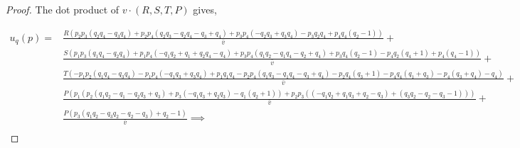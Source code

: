 \begin{proof}
The dot product of \(v \cdot (R, S, T, P)\) gives,

\begingroup
\tiny
\begin{equation*}
\begin{split}
    u_q(p) = & \frac{R \left(p_{2} p_{3} (q_{2} q_{4} - q_{3} q_{4}) + p_{2} p_{4} (q_{2} q_{3} - q_{2} q_{4} - q_{3} + q_{4}) +
    p_{3} p_{4} (- q_{2} q_{3} + q_{3} q_{4}) - p_{3} q_{2} q_{4} + p_{4}q_{4} (q_{2} - 1)\right)}{\bar{v}}  +  \\
    & \frac{S \left(p_{1} p_{3} (q_{1} q_{4} - q_{2} q_{4}) + p_{1} p_{4} (- q_{1} q_{2} + q_{1} + q_{2} q_{4} -
    q_{4}) + p_{3} p_{4} (q_{1} q_{2} - q_{1} q_{4} - q_{2} + q_{4}) + p_{3}q_{4} (q_{2} - 1) -
    p_{4} q_{2} (q_{4} + 1) + p_{4} (q_{4} - 1)\right)}{\bar{v}} + \\
    & \frac{T \left(- p_{1} p_{2} (q_{1} q_{4} - q_{3} q_{4}) - p_{1} p_{4} (- q_{1} q_{3} + q_{3} q_{4})
    + p_{1} q_{1} q_{4} - p_{2} p_{4} (q_{1} q_{3} - q_{1} q_{4} - q_{3} + q_{4}) -
    p_{2} q_{4} (q_{3}  + 1) - p_{4}q_{4} (q_{1} + q_{3}) - p_{4} (q_{3}
    + q_{4}) - q_{4}\right)}{\bar{v}} + \\ 
    & \frac{P \left(p_{1} (p_{2} (q_{1} q_{2} - q_{1} - q_{2} q_{3} + q_{3}) + p_{3} (- q_{1} q_{3} + q_{2} q_{3})
    - q_{1} (q_{2} + 1)) + p_{2} p_{3} ((- q_{1} q_{2} + q_{1} q_{3}
    + q_{2} - q_{3}) + (q_{3}q_{2}  - q_{2} - q_{3} - 1))\right)}{\bar{v}} + \\
    & \frac{P \left(p_{3} (q_{1} q_{2} - q_{3}q_{2} - q_{2} - q_{3}) + q_{2} - 1\right)}{\bar{v}} \implies \\
\end{split}
\end{equation*}
\endgroup


\end{proof}
